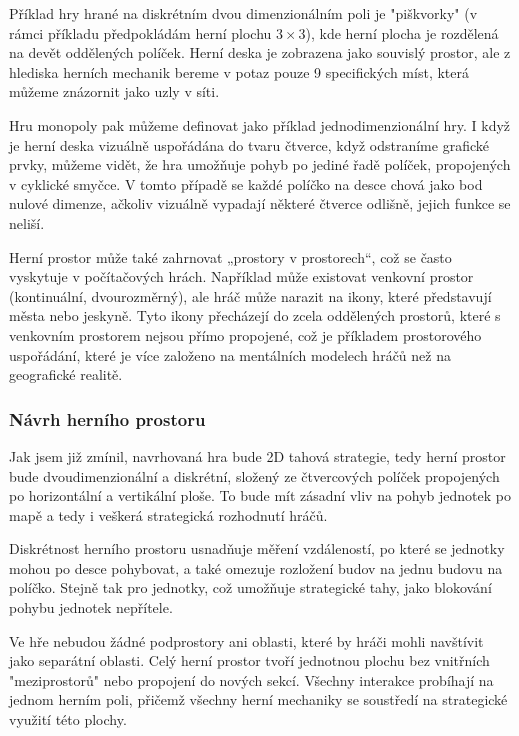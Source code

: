 Příklad hry hrané na diskrétním dvou dimenzionálním poli je "piškvorky" (v rámci příkladu předpokládám herní plochu $3\times3$), kde herní plocha je rozdělená na devět oddělených políček. Herní deska je zobrazena jako souvislý prostor, ale z hlediska herních mechanik bereme v potaz pouze 9 specifických míst, která můžeme znázornit jako uzly v síti.


Hru monopoly pak můžeme definovat jako příklad jednodimenzionální hry. I když je herní deska vizuálně uspořádána do tvaru čtverce, když odstraníme grafické prvky, můžeme vidět, že hra umožňuje pohyb po jediné řadě políček, propojených v cyklické smyčce. V tomto případě se každé políčko na desce chová jako bod nulové dimenze, ačkoliv vizuálně vypadají některé čtverce odlišně, jejich funkce se neliší.

Herní prostor může také zahrnovat „prostory v prostorech“, což se často vyskytuje v počítačových hrách. Například může existovat venkovní prostor (kontinuální, dvourozměrný), ale hráč může narazit na ikony, které představují města nebo jeskyně. Tyto ikony přecházejí do zcela oddělených prostorů, které s venkovním prostorem nejsou přímo propojené, což je příkladem prostorového uspořádání, které je více založeno na mentálních modelech hráčů než na geografické realitě.

\subsubsection{Návrh herního prostoru}

Jak jsem již zmínil, navrhovaná hra bude 2D tahová strategie, tedy herní prostor bude dvoudimenzionální a diskrétní, složený ze čtvercových políček propojených po horizontální a vertikální ploše. To bude mít zásadní vliv na pohyb jednotek po mapě a tedy i veškerá strategická rozhodnutí hráčů.

Diskrétnost herního prostoru usnadňuje měření vzdáleností, po které se jednotky mohou po desce pohybovat, a také omezuje rozložení budov na jednu budovu na políčko. Stejně tak pro jednotky, což umožňuje strategické tahy, jako blokování pohybu jednotek nepřítele.

Ve hře nebudou žádné podprostory ani oblasti, které by hráči mohli navštívit jako separátní oblasti. Celý herní prostor tvoří jednotnou plochu bez vnitřních "meziprostorů" nebo propojení do nových sekcí. Všechny interakce probíhají na jednom herním poli, přičemž všechny herní mechaniky se soustředí na strategické využití této plochy.

